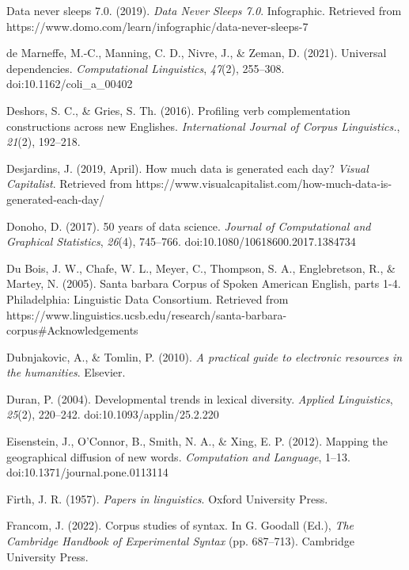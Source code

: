 \documentclass[
  letterpaper,
  krantz1]{latex/krantz-mod}
\newlength{\cslhangindent}
\newenvironment{CSLReferences}[2] %
 {\begin{list}{}{%
  \setlength{\itemindent}{0pt}
  \setlength{\leftmargin}{0pt}
  \setlength{\parsep}{0pt}
  \ifodd #1
   \setlength{\leftmargin}{\cslhangindent}
   \setlength{\itemindent}{-1\cslhangindent}
  \fi
  \setlength{\itemsep}{#2\baselineskip}}}
 {\end{list}}
\theoremstyle{definition}
\theoremstyle{definition}
\theoremstyle{remark}
\begin{document}
\begin{CSLReferences}{1}{0}
Data never sleeps 7.0. (2019). \emph{Data Never Sleeps 7.0}.
Infographic. Retrieved from
https://www.domo.com/learn/infographic/data-never-sleeps-7

de Marneffe, M.-C., Manning, C. D., Nivre, J., \& Zeman, D. (2021).
Universal dependencies. \emph{Computational Linguistics}, \emph{47}(2),
255--308. doi:10.1162/coli\_a\_00402

Deshors, S. C., \& Gries, S. Th. (2016). Profiling verb complementation
constructions across new {Englishes}. \emph{International Journal of
Corpus Linguistics.}, \emph{21}(2), 192--218.

Desjardins, J. (2019, April). How much data is generated each day?
\emph{Visual Capitalist}. Retrieved from
https://www.visualcapitalist.com/how-much-data-is-generated-each-day/

Donoho, D. (2017). 50 years of data science. \emph{Journal of
Computational and Graphical Statistics}, \emph{26}(4), 745--766.
doi:10.1080/10618600.2017.1384734

Du Bois, J. W., Chafe, W. L., Meyer, C., Thompson, S. A., Englebretson,
R., \& Martey, N. (2005). Santa barbara {Corpus} of {Spoken American
English}, parts 1-4. Philadelphia: Linguistic Data Consortium. Retrieved
from
https://www.linguistics.ucsb.edu/research/santa-barbara-corpus\#Acknowledgements

Dubnjakovic, A., \& Tomlin, P. (2010). \emph{A practical guide to
electronic resources in the humanities}. Elsevier.

Duran, P. (2004). Developmental trends in lexical diversity.
\emph{Applied Linguistics}, \emph{25}(2), 220--242.
doi:10.1093/applin/25.2.220

Eisenstein, J., O'Connor, B., Smith, N. A., \& Xing, E. P. (2012).
Mapping the geographical diffusion of new words. \emph{Computation and
Language}, 1--13. doi:10.1371/journal.pone.0113114

Firth, J. R. (1957). \emph{Papers in linguistics}. Oxford University
Press.

Francom, J. (2022). Corpus studies of syntax. In G. Goodall (Ed.),
\emph{The {Cambridge Handbook} of {Experimental Syntax}} (pp. 687--713).
Cambridge University Press.


\end{CSLReferences}
\end{document}
